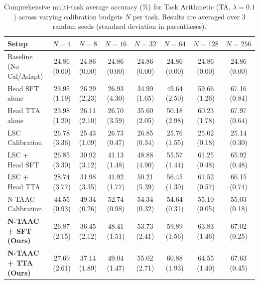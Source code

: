 \begin{table}[ht]
\centering
\caption{Comprehensive multi-task average accuracy (\%) for Task Arithmetic (TA, $\lambda=0.1$) across varying calibration budgets $N$ per task. Results are averaged over 3 random seeds (standard deviation in parentheses).}
\label{tab:appendix_ta_01}
\vskip 0.15in
\begin{sc}
\begin{scriptsize}
\setlength{\tabcolsep}{3pt}
\begin{tabular}{lccccccc}
\toprule
Setup & $N=4$ & $N=8$ & $N=16$ & $N=32$ & $N=64$ & $N=128$ & $N=256$ \\
\midrule
Baseline (No Cal/Adapt) & 24.86 (0.00) & 24.86 (0.00) & 24.86 (0.00) & 24.86 (0.00) & 24.86 (0.00) & 24.86 (0.00) & 24.86 (0.00) \\
Head SFT alone & 23.95 (1.19) & 26.29 (2.23) & 26.93 (4.30) & 34.99 (1.65) & 49.64 (2.50) & 59.66 (1.26) & 67.16 (0.84) \\
Head TTA alone & 23.98 (1.20) & 26.11 (2.10) & 26.70 (3.59) & 35.60 (2.05) & 50.18 (2.98) & 60.23 (1.78) & 67.97 (0.64) \\
LSC Calibration & 26.78 (3.36) & 25.43 (1.09) & 26.73 (0.47) & 26.85 (0.34) & 25.76 (1.55) & 25.02 (0.18) & 25.14 (0.30) \\
LSC + Head SFT & 26.85 (3.30) & 30.92 (3.12) & 41.13 (1.48) & 48.88 (4.90) & 55.57 (1.44) & 61.25 (0.48) & 65.92 (0.48) \\
LSC + Head TTA & 28.74 (3.77) & 31.98 (3.35) & 41.92 (1.77) & 50.21 (5.39) & 56.45 (1.30) & 61.52 (0.57) & 66.15 (0.74) \\
N-TAAC Calibration & 44.55 (0.93) & 49.34 (0.26) & 52.74 (0.98) & 54.34 (0.32) & 54.64 (0.31) & 55.10 (0.05) & 55.03 (0.18) \\
\textbf{N-TAAC + SFT (Ours)} & 26.87 (2.15) & 36.45 (2.12) & 48.41 (1.51) & 53.73 (2.41) & 59.89 (1.56) & 63.83 (1.46) & 67.02 (0.25) \\
\textbf{N-TAAC + TTA (Ours)} & 27.69 (2.61) & 37.14 (1.89) & 49.04 (1.47) & 55.02 (2.71) & 60.88 (1.93) & 64.55 (1.40) & 67.63 (0.45) \\
\bottomrule
\end{tabular}
\end{scriptsize}
\end{sc}
\end{table}

